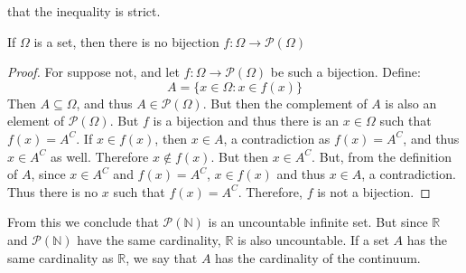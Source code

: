             that the inequality is strict.
            \begin{theorem}
                If $\Omega$ is a set, then there is no bijection
                $f:\Omega\rightarrow\mathcal{P}(\Omega)$
            \end{theorem}
            \begin{proof}
                For suppose not, and let
                $f:\Omega\rightarrow\mathcal{P}(\Omega)$ be such a
                bijection. Define:
                \begin{equation}
                    A=\{x\in\Omega:x\in{f}(x)\}
                \end{equation}
                Then $A\subseteq\Omega$, and thus
                $A\in\mathcal{P}(\Omega)$. But then the complement of
                $A$ is also an element of $\mathcal{P}(\Omega)$. But
                $f$ is a bijection and thus there is an $x\in\Omega$
                such that $f(x)=A^{C}$. If $x\in{f}(x)$, then
                $x\in{A}$, a contradiction as $f(x)=A^{C}$, and thus
                $x\in{A}^{C}$ as well. Therefore $x\notin{f}(x)$. But
                then $x\in{A}^{C}$. But, from the definition of $A$,
                since $x\in{A}^{C}$ and $f(x)=A^{C}$, $x\in{f}(x)$
                and thus $x\in{A}$, a contradiction. Thus there is no
                $x$ such that $f(x)=A^{C}$. Therefore, $f$ is not a
                bijection.
            \end{proof}
            From this we conclude that $\mathcal{P}(\mathbb{N})$
            is an uncountable infinite set. But since $\mathbb{R}$
            and $\mathcal{P}(\mathbb{N})$ have the same cardinality,
            $\mathbb{R}$ is also uncountable.
            If a set $A$ has the same cardinality as $\mathbb{R}$,
            we say that $A$ has the cardinality of the continuum.
